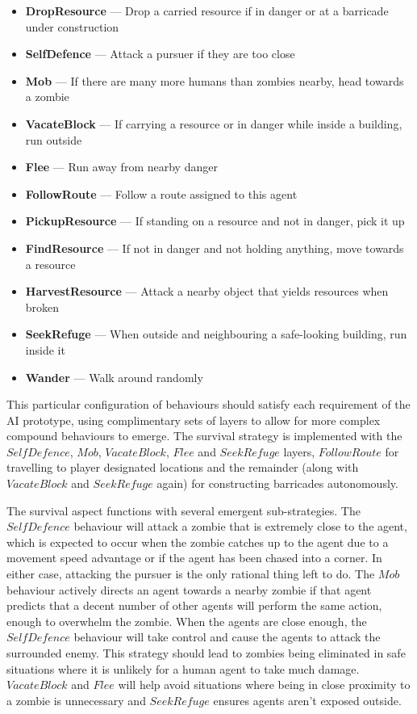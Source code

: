 \documentclass[12pt,a4paper]{article}
\newcommand{\layer}[2]{\item \textbf{#1} --- #2\vspace{-1mm}}
\begin{document}
\noindent
\small{
\begin{itemize}
\layer{DropResource}{Drop a carried resource if in danger or at a barricade under construction}
\layer{SelfDefence}{Attack a pursuer if they are too close}
\layer{Mob}{If there are many more humans than zombies nearby, head towards a zombie}
\layer{VacateBlock}{If carrying a resource or in danger while inside a building, run outside}
\layer{Flee}{Run away from nearby danger}
\layer{FollowRoute}{Follow a route assigned to this agent}
\layer{PickupResource}{If standing on a resource and not in danger, pick it up}
\layer{FindResource}{If not in danger and not holding anything, move towards a resource}
\layer{HarvestResource}{Attack a nearby object that yields resources when broken}
\layer{SeekRefuge}{When outside and neighbouring a safe-looking building, run inside it}
\layer{Wander}{Walk around randomly}
\end{itemize}}

This particular configuration of behaviours should satisfy each requirement of the AI prototype, using complimentary sets of layers to allow for more complex compound behaviours to emerge. The survival strategy is implemented with the $SelfDefence$, $Mob$, $VacateBlock$, $Flee$ and $SeekRefuge$ layers, $FollowRoute$ for travelling to player designated locations and the remainder (along with $VacateBlock$ and $SeekRefuge$ again) for constructing barricades autonomously.

The survival aspect functions with several emergent sub-strategies. The $SelfDefence$ behaviour will attack a zombie that is extremely close to the agent, which is expected to occur when the zombie catches up to the agent due to a movement speed advantage or if the agent has been chased into a corner. In either case, attacking the pursuer is the only rational thing left to do. The $Mob$ behaviour actively directs an agent towards a nearby zombie if that agent predicts that a decent number of other agents will perform the same action, enough to overwhelm the zombie. When the agents are close enough, the $SelfDefence$ behaviour will take control and cause the agents to attack the surrounded enemy. This strategy should lead to zombies being eliminated in safe situations where it is unlikely for a human agent to take much damage. $VacateBlock$ and $Flee$ will help avoid situations where being in close proximity to a zombie is unnecessary and $SeekRefuge$ ensures agents aren't exposed outside.
\end{document}
